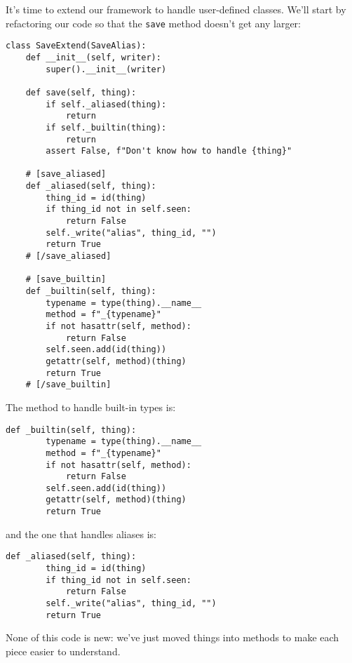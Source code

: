\documentclass{scrbook}
\begin{document}
It's time to extend our framework to handle user-defined classes.
We'll start by refactoring our code so that the \texttt{save} method doesn't get any larger:


\begin{lstlisting}[frame=single,frameround=tttt]
class SaveExtend(SaveAlias):
    def __init__(self, writer):
        super().__init__(writer)

    def save(self, thing):
        if self._aliased(thing):
            return
        if self._builtin(thing):
            return
        assert False, f"Don't know how to handle {thing}"

    # [save_aliased]
    def _aliased(self, thing):
        thing_id = id(thing)
        if thing_id not in self.seen:
            return False
        self._write("alias", thing_id, "")
        return True
    # [/save_aliased]

    # [save_builtin]
    def _builtin(self, thing):
        typename = type(thing).__name__
        method = f"_{typename}"
        if not hasattr(self, method):
            return False
        self.seen.add(id(thing))
        getattr(self, method)(thing)
        return True
    # [/save_builtin]
\end{lstlisting}



\noindent The method to handle built-in types is:


\begin{lstlisting}[frame=single,frameround=tttt]
    def _builtin(self, thing):
        typename = type(thing).__name__
        method = f"_{typename}"
        if not hasattr(self, method):
            return False
        self.seen.add(id(thing))
        getattr(self, method)(thing)
        return True
\end{lstlisting}



\noindent and the one that handles aliases is:


\begin{lstlisting}[frame=single,frameround=tttt]
    def _aliased(self, thing):
        thing_id = id(thing)
        if thing_id not in self.seen:
            return False
        self._write("alias", thing_id, "")
        return True
\end{lstlisting}



\noindent None of this code is new:
we've just moved things into methods
to make each piece easier to understand.
\end{document}
